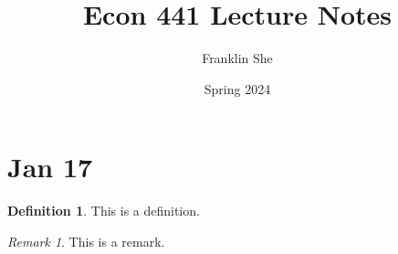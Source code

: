 \documentclass[12pt]{article}
\title{Econ 441 Lecture Notes}
\author{Franklin She}
\date{Spring 2024}
\theoremstyle{definition}
\newtheorem{definition}[theorem]{Definition}
\theoremstyle{remark}
\newtheorem*{remark}{Remark}
\begin{document}
\maketitle

\section{Jan 17}

\begin{definition}
    This is a definition.
\end{definition}

\begin{remark}
    This is a remark.
\end{remark}
\end{document}
